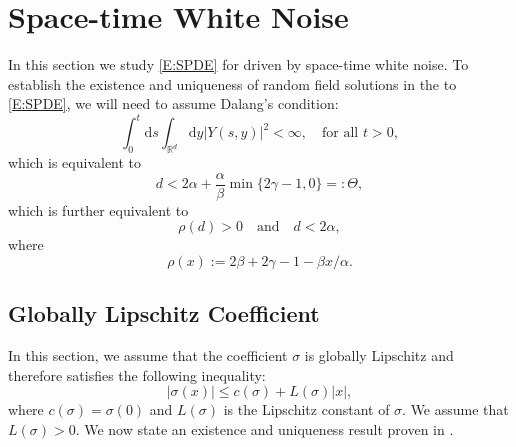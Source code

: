 \documentclass[a4paper,11pt]{article}
\numberwithin{equation}{section}
\theoremstyle{plain}
\theoremstyle{definition}
\newcommand{\ud}{\ensuremath{\mathrm{d} }}
\newcommand{\R}{\mathbb{R}}
\numberwithin{NQ}{section}
\numberwithin{LQ}{section}
\numberwithin{ZQ}{section}
\begin{document}
	\section{Space-time White Noise}
	In this section we study \eqref{E:SPDE} for driven by space-time white noise. To establish the existence and uniqueness of random field solutions in the to \eqref{E:SPDE}, we will need to assume Dalang's condition:
	\begin{equation}
	\label{C:Dalang}
	\int_0^t \ud s \int_{\R^d} \ud y |Y(s,y)|^2 < \infty, \quad \text{for all } t>0,
	\end{equation} 
	which is equivalent to
	\begin{equation}
	\label{E:DalangEquiv}
	d < 2\alpha + \frac{\alpha}{\beta}\min\{2\gamma -1, 0\} =: \Theta,
	\end{equation}
	which is further equivalent to 
	\begin{equation}
	\label{E:DalangEquiv2}
	\rho(d) > 0 \quad \text{and} \quad d < 2\alpha,
	\end{equation}
	where 
	\begin{equation}
	\label{D:theta}
	\rho(x) := 2\beta + 2\gamma -1 -\beta x / \alpha.
	\end{equation} 
	\subsection{Globally Lipschitz Coefficient}
	In this section, we assume that the coefficient $\sigma$ is globally Lipschitz and therefore satisfies the following inequality:
	\[
	|\sigma(x)| \le c(\sigma) + L(\sigma)|x|,
	\] 
	where $c(\sigma) = \sigma(0)$ and $L(\sigma)$ is the Lipschitz constant of $\sigma$. We assume that $L(\sigma)>0$. We now state an existence and uniqueness result proven in \cite{CHN19}.
	
\end{document}
